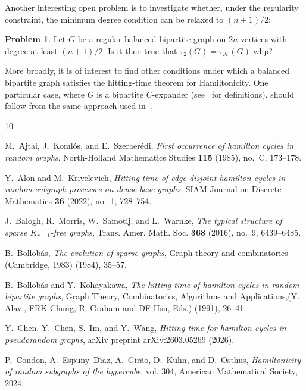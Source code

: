 \documentclass[reqno,final,a4paper]{amsart}
\numberwithin{equation}{section}
\theoremstyle{definition}
\newtheorem{problem}[theorem]{Problem}
\theoremstyle{remark}
\def\calH{\mathcal{H}}
\begin{document}
Another interesting open problem is to investigate whether, under the regularity constraint, the minimum degree condition can be relaxed to $(n+1)/2$:
\begin{problem}
    Let $G$ be a regular balanced bipartite graph on $2n$ vertices with degree at least $(n+1)/2$. Is it then true that $\tau_2(G) = \tau_{\calH}(G)$ whp?
\end{problem}
More broadly, it is of interest to find other conditions under which a balanced bipartite graph satisfies the hitting-time theorem for Hamiltonicity. One particular case, where $G$ is a bipartite $C$-expander (see~\cite{Draganic-Kim-Lee-David-Pavez-Sudakov} for definitions), should follow from the same approach used in~\cite{Chen-Chen-Im-Wang}.

\begin{thebibliography}{10}

M.~Ajtai, J.~Koml{\'o}s, and E.~Szeraer{\'e}di, \emph{First occurrence of hamilton cycles in random graphs}, North-Holland Mathematics Studies \textbf{115} (1985), no.~C, 173--178.

Y.~Alon and M.~Krivelevich, \emph{Hitting time of edge disjoint hamilton cycles in random subgraph processes on dense base graphs}, SIAM Journal on Discrete Mathematics \textbf{36} (2022), no.~1, 728--754.

J.~Balogh, R.~Morris, W.~Samotij, and L.~Warnke, \emph{The typical structure of sparse {$K_{r+1}$}-free graphs}, Trans. Amer. Math. Soc. \textbf{368} (2016), no.~9, 6439--6485.

B.~Bollob{\'a}s, \emph{The evolution of sparse graphs}, Graph theory and combinatorics (Cambridge, 1983) (1984), 35--57.

B.~Bollob{\'a}s and Y.~Kohayakawa, \emph{The hitting time of hamilton cycles in random bipartite graphs}, Graph Theory, Combinatorics, Algorithms and Applications,(Y. Alavi, FRK Chung, R. Graham and DF Hsu, Eds.) (1991), 26--41.

Y.~Chen, Y.~Chen, S.~Im, and Y.~Wang, \emph{Hitting time for hamilton cycles in pseudorandom graphs}, arXiv preprint arXiv:2603.05269 (2026).

P.~Condon, A.~Espuny~D{\'\i}az, A.~Gir{\~a}o, D.~K{\"u}hn, and D.~Osthus, \emph{Hamiltonicity of random subgraphs of the hypercube}, vol. 304, American Mathematical Society, 2024.


\end{thebibliography}
\end{document}
